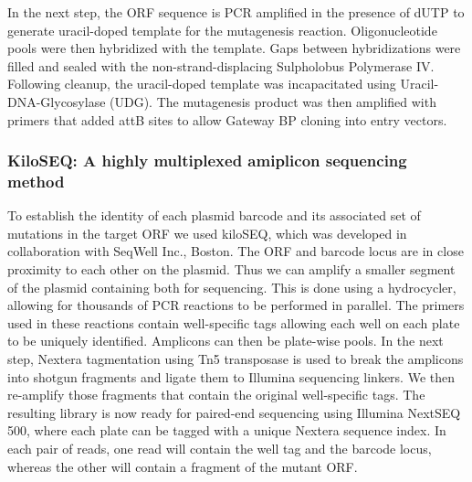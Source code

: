 In the next step, the ORF sequence is PCR amplified in the presence of dUTP to generate uracil-doped template for the mutagenesis reaction. Oligonucleotide pools were then hybridized with the template. Gaps between hybridizations were filled and sealed with the non-strand-displacing Sulpholobus Polymerase IV. Following cleanup, the uracil-doped template was incapacitated using Uracil-DNA-Glycosylase (UDG). The mutagenesis product was then amplified with primers that added attB sites to allow Gateway BP cloning into entry vectors.

\subsubsection{KiloSEQ: A highly multiplexed amiplicon sequencing method}

To establish the identity of each plasmid barcode and its associated set of mutations in the target ORF we used kiloSEQ, which was developed in collaboration with SeqWell Inc., Boston. The ORF and barcode locus are in close proximity to each other on the plasmid. Thus we can amplify a smaller segment of the plasmid containing both for sequencing. This is done using a hydrocycler, allowing for thousands of PCR reactions to be performed in parallel. The primers used in these reactions contain well-specific tags allowing each well on each plate to be uniquely identified. Amplicons can then be plate-wise pools. In the next step, Nextera tagmentation using Tn5 transposase is used to break the amplicons into shotgun fragments and ligate them to Illumina sequencing linkers. We then re-amplify those fragments that contain the original well-specific tags. The resulting library is now ready for paired-end sequencing using Illumina NextSEQ 500, where each plate can be tagged with a unique Nextera sequence index. In each pair of reads, one read will contain the well tag and the barcode locus, whereas the other will contain a fragment of the mutant ORF.

